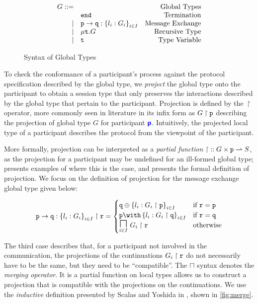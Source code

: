 \begin{figure}[!hb]
\doublespacing
\[
\begin{array}{rlr}

G ::= & & \text{Global Types} \\
     & \textnormal{\texttt{end}} & \text{Termination} \\
\mid & {\mathtt{p}} \to {\mathtt{q}} : \left\{ {l_i: G_i} \right\}_{i \in I} & \text{Message Exchange} \\
\mid & \mu\textnormal{\texttt{t}}.{G} & \text{Recursive Type} \\
\mid & \textnormal{\texttt{t}} & \text{Type Variable} \\
\end{array}
\]
\singlespacing
\caption{Syntax of Global Types}
\label{fig:mpst}
\end{figure}

To check the conformance of a participant's process 
against the protocol specification 
described by the global type, 
we \textit{project} the global type onto the participant
to obtain a session type that only preserves the 
interactions described by the global type that 
pertain to the participant. 
Projection is defined by the $\upharpoonright$ operator, 
more commonly seen in literature in its infix form 
as ${G} \upharpoonright {\mathtt{p}}$ describing the projection of global type 
$G$ for participant ${\color{blue}\bm{\mathsf{p}}}$. 
Intuitively, the projected local type of a participant 
describes the protocol from the viewpoint of the participant.

More formally, projection can be interpreted as a 
\textit{partial function} 
${\upharpoonright} :: G \times {\mathtt{p}} \rightharpoonup S$,
as the projection for a participant may be undefined for 
an ill-formed global type; 
\cite{C406Lecture} presents examples of where this is the case, 
and \cite{MPST} presents the formal definition of projection.
We focus on the definition of projection for the 
message exchange global type given below:

\[
\proj{\gcomm{p}{q}{l_i: G_i}{i \in I}}{r} =
\begin{cases}
\tsel{q}{l_i: \proj{G_i}{p}}{i \in I} 
	& \text{if } \mrole{r} = \mrole{p} \\
\tbra{p}{l_i: \proj{G_i}{q}}{i \in I} 
	& \text{if } \mrole{r} = \mrole{q} \\
\underset{i \in I}{\MERGEOP}~\proj{G_i}{r}
	& \text{otherwise} \\
\end{cases}
\]

The third case describes that,
for a participant not involved in the communication,
the projections of the continuations ${G_i} \upharpoonright {\mathtt{r}}$
do not necessarily have to be the same, but they
need to be ``compatible''. 
The $\sqcap$ syntax denotes the \textit{merging operator}.
It is a partial function on local types allows us to construct
a projection that is compatible with the projections on
the continuations.
We use the \textit{inductive} definition presented by
Scalas and Yoshida in \cite{LessIsMore}, shown in \cref{fig:merge}.

